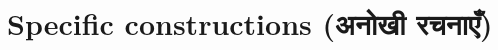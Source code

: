 \section[Specific constructions]{Specific constructions (\textsanskrit{अनोखी रचनाएँ})} \label{sec:hispco}